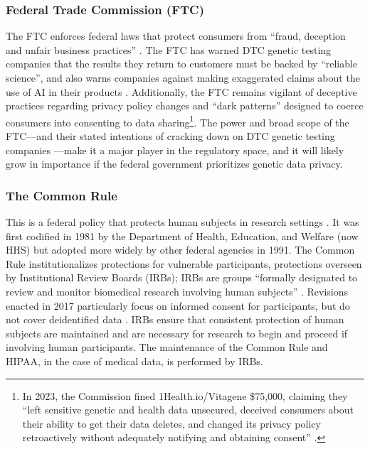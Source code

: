 \subsubsection{Federal Trade Commission (FTC)}
The FTC enforces federal laws that protect consumers from ``fraud, deception and unfair business practices'' \cite{federal_trade_commission_coop_nodate}. The FTC has warned DTC genetic testing companies that the results they return to customers must be backed by ``reliable science'', and also warns companies against making exaggerated claims about the use of AI in their products \cite{jillson_dna_2024}. Additionally, the FTC remains vigilant of deceptive practices regarding privacy policy changes and ``dark patterns'' designed to coerce consumers into consenting to data sharing\footnote{In 2023, the Commission fined 1Health.io/Vitagene \$75,000, claiming they ``left sensitive genetic and health data unsecured, deceived consumers about their ability to get their data deletes, and changed its privacy policy retroactively without adequately notifying and obtaining consent'' \cite{ftc_1health_2023}.}. The power and broad scope of the FTC—and their stated intentions of cracking down on DTC genetic testing companies \cite{jillson_dna_2024}—make it a major player in the regulatory space, and it will likely grow in importance if the federal government prioritizes genetic data privacy. 

\subsubsection{The Common Rule}
This is a federal policy that protects human subjects in research settings \cite{sciences_federal_2014}. It was first codified in 1981 by the Department of Health, Education, and Welfare (now HHS) but adopted more widely by other federal agencies in 1991. The Common Rule institutionalizes protections for vulnerable participants, protections overseen by Institutional Review Boards (IRBs); IRBs are groups ``formally designated to review and monitor biomedical research involving human subjects'' \cite{research_institutional_2024}. Revisions enacted in 2017 particularly focus on informed consent for participants, but do not cover deidentified data \cite{menikoff_common_2017, protections_ohrp_federal_2009}. IRBs ensure that consistent protection of human subjects are maintained and are necessary for research to begin and proceed if involving human participants. The maintenance of the Common Rule and HIPAA, in the case of medical data, is performed by IRBs.
